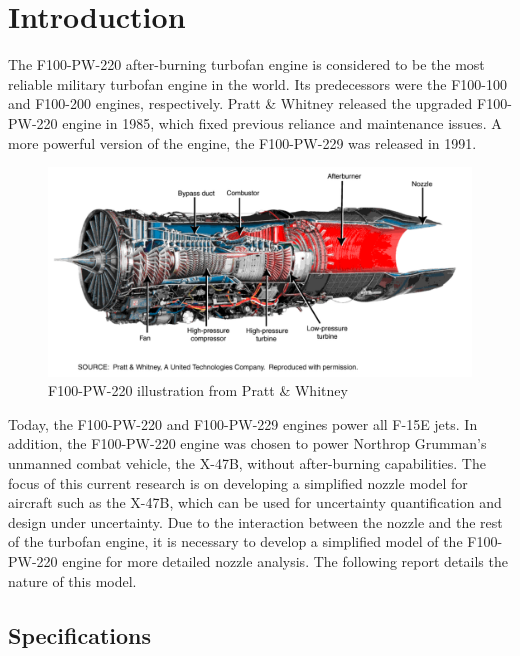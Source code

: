 \documentclass{article}
\begin{document}
\section{Introduction}

The F100-PW-220 after-burning turbofan engine is considered to be the most reliable military turbofan engine in the world. Its predecessors were the F100-100 and F100-200 engines, respectively. Pratt \& Whitney released the upgraded F100-PW-220 engine in 1985, which fixed previous reliance and maintenance issues. A more powerful version of the engine, the F100-PW-229 was released in 1991.

\begin{figure}
\caption{F100-PW-220 illustration from Pratt \& Whitney}
\label{fig:engine_illustration}
\begin{center}
\includegraphics[scale=0.5]{figs/F100-PW-220-Military_Jet_Acquisition_by_RAND_Project_Air_Force.png}
\end{center}
\end{figure}

Today, the F100-PW-220 and F100-PW-229 engines power all F-15E jets. In addition, the F100-PW-220 engine was chosen to power Northrop Grumman's unmanned combat vehicle, the X-47B, without after-burning capabilities. The focus of this current research is on developing a simplified nozzle model for aircraft such as the X-47B, which can be used for uncertainty quantification and design under uncertainty. Due to the interaction between the nozzle and the rest of the turbofan engine, it is necessary to develop a simplified model of the F100-PW-220 engine for more detailed nozzle analysis. The following report details the nature of this model.

\subsection{Specifications}
\end{document}
